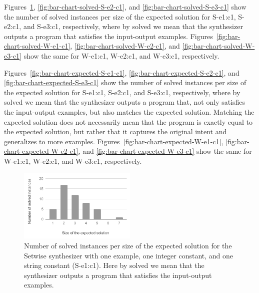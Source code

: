 Figures~\ref{fig:bar-chart-solved-S-e1-c1}, \ref{fig:bar-chart-solved-S-e2-c1},
and \ref{fig:bar-chart-solved-S-e3-c1} show the number of solved instances per
size of the expected solution for S-e1:c1, S-e2:c1, and S-e3:c1, respectively,
where by solved we mean that the synthesizer outputs a program that satisfies
the input-output examples.
Figures~\ref{fig:bar-chart-solved-W-e1-c1}, \ref{fig:bar-chart-solved-W-e2-c1},
and \ref{fig:bar-chart-solved-W-e3-c1} show the same for W-e1:c1, W-e2:c1, and
W-e3:c1, respectively.

Figures~\ref{fig:bar-chart-expected-S-e1-c1}, \ref{fig:bar-chart-expected-S-e2-c1},
and \ref{fig:bar-chart-expected-S-e3-c1} show the number of solved instances per
size of the expected solution for S-e1:c1, S-e2:c1, and S-e3:c1, respectively,
where by solved we mean that the synthesizer outputs a program that, not only
satisfies the input-output examples, but also matches the expected solution.
Matching the expected solution does not necessarily mean that the program is
exactly equal to the expected solution, but rather that it captures the original
intent and generalizes to more examples.
Figures~\ref{fig:bar-chart-expected-W-e1-c1}, \ref{fig:bar-chart-expected-W-e2-c1},
and \ref{fig:bar-chart-expected-W-e3-c1} show the same for W-e1:c1, W-e2:c1, and
W-e3:c1, respectively.

\begin{figure}
  \centering
  \includegraphics[width=0.5\textwidth]{assets/bar-chart-solved-S-e1-c1.pdf}
  \caption{Number of solved instances per size of the expected solution for
    the Setwise synthesizer with one example, one integer constant, and one
    string constant (S-e1:c1). Here by solved we mean that the synthesizer
    outputs a program that satisfies the input-output examples.}
  \label{fig:bar-chart-solved-S-e1-c1}
\end{figure}

